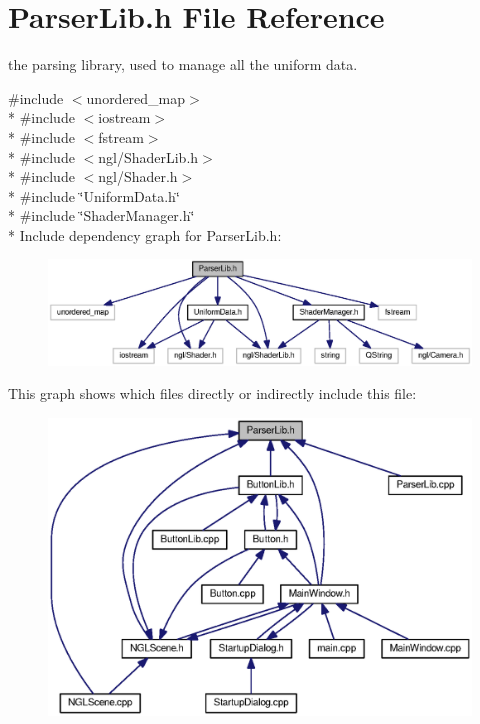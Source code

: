 \section{Parser\-Lib.\-h File Reference}
\label{_parser_lib_8h}


the parsing library, used to manage all the uniform data.  


{\ttfamily \#include $<$unordered\-\_\-map$>$}\\*
{\ttfamily \#include $<$iostream$>$}\\*
{\ttfamily \#include $<$fstream$>$}\\*
{\ttfamily \#include $<$ngl/\-Shader\-Lib.\-h$>$}\\*
{\ttfamily \#include $<$ngl/\-Shader.\-h$>$}\\*
{\ttfamily \#include \char`\"{}Uniform\-Data.\-h\char`\"{}}\\*
{\ttfamily \#include \char`\"{}Shader\-Manager.\-h\char`\"{}}\\*
Include dependency graph for Parser\-Lib.\-h\-:\nopagebreak
\begin{figure}[H]
\begin{center}
\leavevmode
\includegraphics[width=350pt]{_parser_lib_8h__incl}
\end{center}
\end{figure}
This graph shows which files directly or indirectly include this file\-:\nopagebreak
\begin{figure}[H]
\begin{center}
\leavevmode
\includegraphics[width=350pt]{_parser_lib_8h__dep__incl}
\end{center}
\end{figure}

